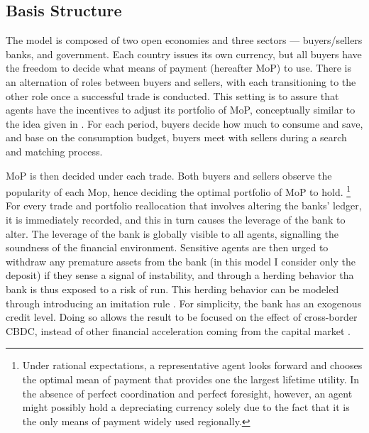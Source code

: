 \subsection{Basis Structure}

The model is composed of two open economies and three sectors --- buyers/sellers
banks, and government. Each country issues its own currency, but all buyers have
the freedom to decide what means of payment (hereafter MoP) to use.  There is
an alternation of roles between buyers and sellers, with each transitioning to
the other role once a successful trade is conducted. This setting is to assure
that agents have the incentives to adjust its portfolio of MoP, conceptually
similar to the idea given in \citet*{TW95}. For each period, buyers decide how
much to consume and save, and base on the consumption budget, buyers meet with
sellers during a search and matching process. 

MoP is then decided under each trade. Both buyers and sellers observe the
popularity of each Mop, hence deciding the optimal portfolio of MoP to hold.
\footnote{Under rational expectations, a representative agent looks forward and
chooses the optimal mean of payment that provides one the largest lifetime
utility. In the absence of perfect coordination and perfect foresight, however,
an agent might possibly hold a depreciating currency solely due to the fact that
it is the only means of payment widely used regionally.}
For every trade and portfolio reallocation that involves altering the banks' ledger, it is immediately recorded, and this in turn causes the leverage of the bank to alter. The leverage of the bank is globally visible to all agents, signalling the soundness of the financial environment. Sensitive agents are then urged to withdraw any premature assets from the bank (in this model I consider only the deposit) if they sense a signal of instability, and through a herding behavior tha bank is thus exposed to a risk of run. This herding behavior can be modeled through introducing an imitation rule \citep*{Santos2021}. For simplicity, the bank has an exogenous credit level. Doing so allows the result to be focused on the effect of cross-border CBDC, instead of other financial acceleration coming from the capital market \citep{BGG96}.  




